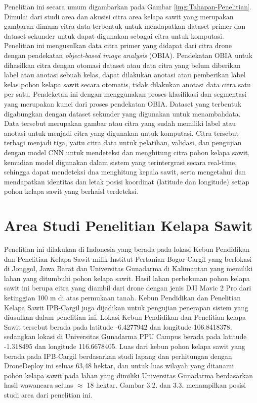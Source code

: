 Penelitian ini secara umum digambarkan pada Gambar \ref{img:Tahapan-Penelitian}. Dimulai dari studi area dan akusisi citra area kelapa sawit yang merupakan gambaran dimana citra data terbentuk untuk mendapatkan dataset primer dan dataset sekunder untuk dapat digunakan sebagai citra untuk komputasi. Penelitian ini mengusulkan data citra primer yang didapat dari citra drone dengan pendekatan \textit{object-based image analysis} (OBIA). Pendekatan OBIA untuk dihasilkan citra dengan otomasi dataset atau data citra yang belum diberikan label atau anotasi sebuah kelas, dapat dilakukan anotasi atau pemberikan label kelas pohon kelapa sawit secara otomatis, tidak dilakukan anotasi data citra satu per satu. Pendeketan ini dengan menggunakan proses klasifikasi dan segmentasi yang merupakan kunci dari proses pendekatan OBIA. Dataset yang terbentuk digabungkan dengan dataset sekunder yang digunakan untuk menambahdata. Data tersebut merupakan gambar atau citra yang sudah memiliki label atau anotasi untuk menjadi citra yang digunakan untuk komputasi. Citra tersebut terbagi menjadi tiga, yaitu citra data untuk pelatihan, validasi, dan pengujian dengan model CNN untuk mendeteksi dan menghitung citra pohon kelapa sawit, kemudian model digunakan dalam sistem yang terintergrasi secara real-time, sehingga dapat mendeteksi dna menghitung kepala sawit, serta mengetahui dan mendapatkan identitas dan letak posisi koordinat (latitude dan longitude) setiap pohon kelapa sawit yang berhaisl terdeteksi.

\section{Area Studi Penelitian Kelapa Sawit}
\hspace{1,2cm}Penelitian ini dilakukan di Indonesia yang berada pada lokasi Kebun Pendidikan dan Penelitian Kelapa Sawit milik Institut Pertanian Bogor-Cargil yang berlokasi di Jonggol, Jawa Barat dan Universitas Gunadarma di Kalimantan yang memiliki lahan yang ditumbuhi pohon kelapa sawit. Hasil lahan perbekunan pohon kelapa sawit ini berupa citra yang diambil dari drone dengan jenis DJI Mavic 2 Pro dari ketinggian 100 m di atas permukaan tanah. Kebun Pendidikan dan Penelitian Kelapa Sawit IPB-Cargil juga dijadikan untuk pengujian penerapan sistem yang diusulkan dalam penelitian ini. Lokasi Kebun Pendidikan dan Penelitian kelapa Sawit tersebut berada pada latitude -6.4277942 dan longitude 106.8418378, sedangkan lokasi di Universitas Gunadarma PPU Campus berada pada latitude -1.318495 dan longitude 116.6678405. Luas dari kebun pohon kelapa sawit yang berada pada IPB-Cargil berdasarkan studi lapang dan perhitungan dengan DroneDeploy ini seluas 63,48 hektar, dan untuk luas wilayah yang ditanami pohon kelapa sawit pada lahan yang dimiliki Universitas Gunadarma berdasarkan hasil wawancara seluas $\approx$ 18 hektar. Gambar 3.2. dan 3.3. menampilkan posisi studi area dari penelitian ini.

